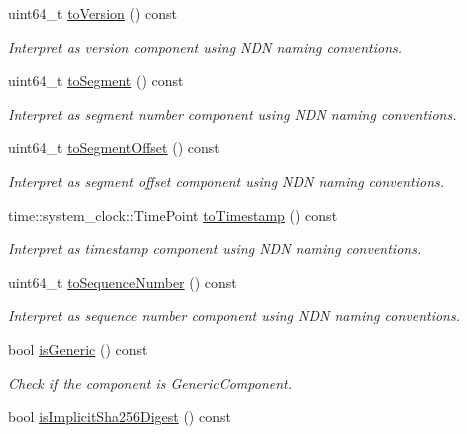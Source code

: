 \begin{DoxyCompactItemize}
uint64\+\_\+t \hyperlink{classndn_1_1name_1_1Component_afa91a98934f383905669fde40bd3c8df}{to\+Version} () const
\begin{DoxyCompactList}\small\item\em Interpret as version component using N\+DN naming conventions. \end{DoxyCompactList}\item 
uint64\+\_\+t \hyperlink{classndn_1_1name_1_1Component_a0143d8803b4179a5ef4ed086bdc9af94}{to\+Segment} () const
\begin{DoxyCompactList}\small\item\em Interpret as segment number component using N\+DN naming conventions. \end{DoxyCompactList}\item 
uint64\+\_\+t \hyperlink{classndn_1_1name_1_1Component_a266822576225e866bc4d2893a56697f2}{to\+Segment\+Offset} () const
\begin{DoxyCompactList}\small\item\em Interpret as segment offset component using N\+DN naming conventions. \end{DoxyCompactList}\item 
time\+::system\+\_\+clock\+::\+Time\+Point \hyperlink{classndn_1_1name_1_1Component_ac265e3551bf81279c9042f402d898729}{to\+Timestamp} () const
\begin{DoxyCompactList}\small\item\em Interpret as timestamp component using N\+DN naming conventions. \end{DoxyCompactList}\item 
uint64\+\_\+t \hyperlink{classndn_1_1name_1_1Component_a6feb418c51675843250d409291e1e517}{to\+Sequence\+Number} () const
\begin{DoxyCompactList}\small\item\em Interpret as sequence number component using N\+DN naming conventions. \end{DoxyCompactList}\item 
bool \hyperlink{classndn_1_1name_1_1Component_a1573a8ddf0e3817db4f11cc4f32541c5}{is\+Generic} () const\hypertarget{classndn_1_1name_1_1Component_a1573a8ddf0e3817db4f11cc4f32541c5}{}\label{classndn_1_1name_1_1Component_a1573a8ddf0e3817db4f11cc4f32541c5}

\begin{DoxyCompactList}\small\item\em Check if the component is Generic\+Component. \end{DoxyCompactList}\item 
bool \hyperlink{classndn_1_1name_1_1Component_af10acba4423f250c9045fa87353b2b7a}{is\+Implicit\+Sha256\+Digest} () const\hypertarget{classndn_1_1name_1_1Component_af10acba4423f250c9045fa87353b2b7a}{}\label{classndn_1_1name_1_1Component_af10acba4423f250c9045fa87353b2b7a}


\end{DoxyCompactItemize}
